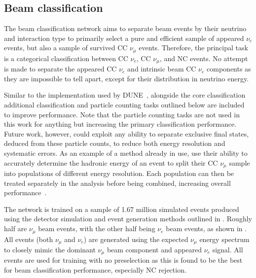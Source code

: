 \subsection{Beam classification}%
\label{sec:cnn_specific_beam} %

The beam classification network aims to separate beam events by their neutrino and interaction
type to primarily select a pure and efficient sample of appeared $\nu_{e}$ events, but also a
sample of survived CC $\nu_{\mu}$ events. Therefore, the principal task is a categorical
classification between CC $\nu_{e}$, CC $\nu_{\mu}$, and NC events. No attempt is made to separate
the appeared CC $\nu_{e}$ and intrinsic beam CC $\nu_{e}$ components as they are impossible to
tell apart, except for their distribution in neutrino energy.

Similar to the implementation used by DUNE~\cite{collaboration2020}, alongside the core
classification additional classification and particle counting tasks outlined below are included
to improve performance. Note that the particle counting tasks are not used in this work for
anything but increasing the primary classification performance. Future work, however, could
exploit any ability to separate exclusive final states, deduced from these particle counts, to
reduce both energy resolution and systematic errors. As an example of a method already in use,
\nova use their ability to accurately determine the hadronic energy of an event to split their CC
$\nu_{\mu}$ sample into populations of different energy resolution. Each population can then be
treated separately in the analysis before being combined, increasing overall
performance~\cite{acero2018}.

The network is trained on a sample of 1.67 million simulated events produced using the detector
simulation and event generation methods outlined in . Roughly
half are $\nu_{\mu}$ beam events, with the other half being $\nu_{e}$ beam events, as shown in
. All events (both $\nu_{\mu}$ and $\nu_{e}$) are generated
using the expected \chipsfive $\nu_{\mu}$ energy spectrum to closely mimic the dominant
$\nu_{\mu}$ beam component and appeared $\nu_{e}$ signal. All events are used for training with no
preselection as this is found to be the best for beam classification performance, especially NC
rejection.

